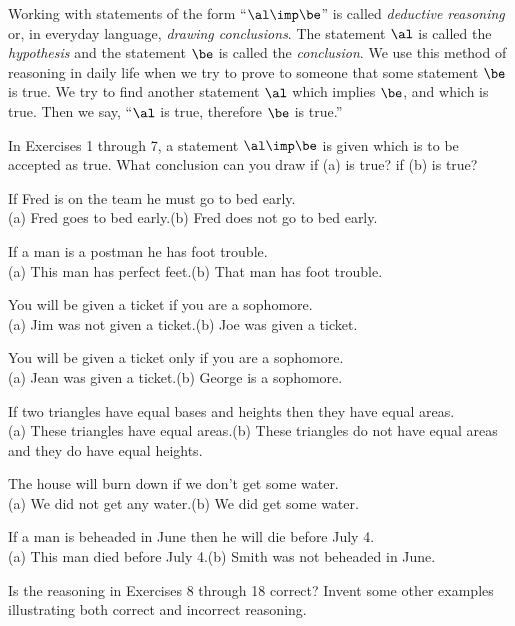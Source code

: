 \documentclass[11pt]{book}
\theoremstyle{bkplain}
\theoremstyle{XIplainnote}
\theoremstyle{bkplain}
\theoremstyle{bkplain}
\begin{document}
Working with statements of the form ``$\al \imp \be$'' is called \emph{deductive
reasoning} or, in everyday language, \emph{drawing conclusions}. The statement
$\al$ is called the \emph{hypothesis} and the statement $\be$ is called the
\emph{conclusion}. We use this method of reasoning in daily life when we try to
prove to someone that some statement $\be$ is true. We try to find another
statement $\al$ which implies $\be$, and which is true. Then we say, ``$\al$ is
true, therefore $\be$ is true.''


In Exercises 1 through 7, a statement $\al \imp \be$ is given which is to be
accepted as true. What conclusion can you draw if (a) is true? if (b) is true?

\begin{exercisecols}
\begin{exlist}
\item If Fred is on the team he must go to bed early.\\
      (a) Fred goes to bed early.\qquad (b) Fred does not go to bed early.
\item If a man is a postman he has foot trouble.\\
      (a) This man has perfect feet.\qquad (b) That man has foot trouble.
\item You will be given a ticket if you are a sophomore.\\
      (a) Jim was not given a ticket.\qquad (b) Joe was given a ticket.
\item You will be given a ticket only if you are a sophomore.\\
      (a) Jean was given a ticket.\qquad (b) George is a sophomore.
\item If two triangles have equal bases and heights then they have equal areas.\\
      (a) These triangles have equal areas.\qquad (b) These triangles do not have
      equal areas and they do have equal heights.
\item The house will burn down if we don't get some water.\\
      (a) We did not get any water.\qquad (b) We did get some water.
\item If a man is beheaded in June then he will die before July 4.\\
      (a) This man died before July 4.\qquad (b) Smith was not beheaded in June.
\end{exlist}

Is the reasoning in Exercises 8 through 18 correct? Invent some other examples
illustrating both correct and incorrect reasoning.


\end{exercisecols}
\end{document}
